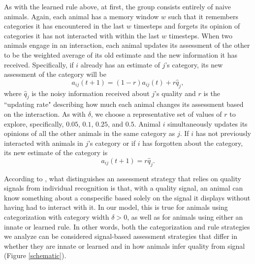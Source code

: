 As with the learned rule above, at first, the group consists entirely of naive animals. Again, each animal has a memory window $w$ such that it remembers categories it has encountered in the last $w$ timesteps and forgets its opinion of categories it has not interacted with within the last $w$ timesteps. When two animals engage in an interaction, each animal updates its assessment of the other to be the weighted average of its old estimate and the new information it has received. Specifically, if $i$ already has an estimate of $j$'s category, its new assessment of the category will be
\begin{equation*}
a_{ij}(t+1)=(1-r)a_{ij}(t)+r\hat{q}_j,
\end{equation*}
where $\hat{q}_j$ is the noisy information received about $j$'s quality and $r$ is the ``updating rate" describing how much each animal changes its assessment based on the interaction. As with $\delta$, we choose a representative set of values of $r$ to explore, specifically, $0.05$, $0.1$, $0.25$, and $0.5$. Animal $i$ simultaneously updates its opinions of all the other animals in the same category as $j$.
If $i$ has not previously interacted with animals in $j$'s category or if $i$ has forgotten about the category, its new estimate of the category is
\begin{equation*}
a_{ij}(t+1)=r\hat{q}_j.
\end{equation*}

According to \citet{sheehan2016evotradeoff}, what distinguishes an assessment strategy that relies on quality signals from individual recognition is that, with a quality signal, an animal can know something about a conspecific based solely on the signal it displays without having had to interact with it. In our model, this is true for animals using categorization with category width $\delta>0$, as well as for animals using either an innate or learned rule. In other words, both the categorization and rule strategies we analyze can be considered signal-based assessment strategies that differ in whether they are innate or learned and in how animals infer quality from signal (Figure \ref{schematic}). 
 
